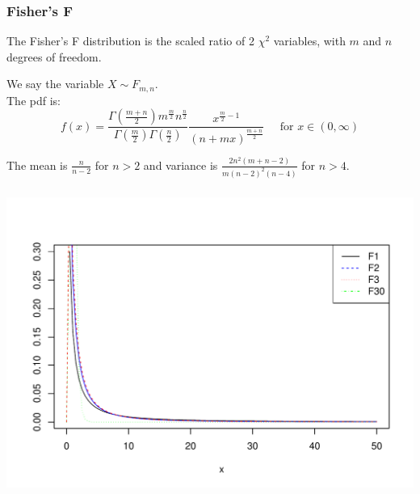 \documentclass[t,xcolor=pdftex,dvipsnames,table]{beamer}\usepackage[]{graphicx}\usepackage[]{color}
\makeatletter
\def\maxwidth{ %
  \ifdim\Gin@nat@width>\linewidth
    \linewidth
  \else
    \Gin@nat@width
  \fi
}
\newenvironment{knitrout}{}{} %
\makeatother
\begin{document}
\begin{frame}\frametitle{Fisher's F}

\begin{definition}
The \alert{Fisher's F distribution} is the scaled ratio of 2 $\chi^2$ variables, with $m$ and $n$ degrees of freedom.

\vspace{.5cm}
We say the variable $X \sim F_{m,n}$. \\

\vspace{.5cm}
The pdf is:
\[ f(x)  =  \frac{ \Gamma( \frac{m+n}{2} ) m^{\frac{m}{2}}  n^{\frac{n}{2}}   }{ \Gamma( \frac{m}{2} )  \Gamma( \frac{n}{2} )}
\frac{ x^{\frac{m}{2}-1}  }{ (n + mx)^{\frac{m+n}{2}}      }
\;\;\;\;\; \mbox{for }  x \in (0, \infty) \]



\vspace{.5cm}
The mean is $\frac{n}{n-2}$ for $n >2$ and variance is $\frac{2 n^2 (m+n-2)}{m (n-2)^2(n-4)}$ for $n > 4$.



\end{definition}

\end{frame}


\begin{frame}[fragile]\frametitle{}

\begin{knitrout}
\color{fgcolor}
\includegraphics[width=\maxwidth]{figure/unnamed-chunk-99-1} 

\end{knitrout}
\end{frame}
\end{document}
